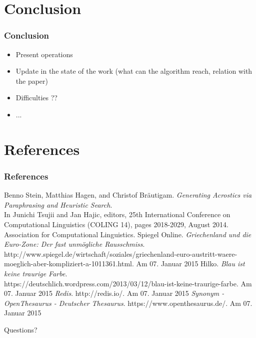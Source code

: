 \documentclass{beamer}
\begin{document}
\section{Conclusion}

\begin{frame}
\frametitle{Conclusion}
\begin{itemize}
\item Present operations
\item Update in the state of the work (what can the algorithm reach, relation with the paper)
\item Difficulties ??
\item ...
\end{itemize}
\end{frame}

\section{References}

\begin{frame}
\frametitle{References}
\scriptsize
\begin{thebibliography}{1}
	Benno Stein, Matthias Hagen, and Christof Bräutigam. \emph{Generating Acrostics via Paraphrasing and Heuristic Search}. \\
	In Junichi Tsujii and Jan Hajic, editors, 25th International Conference on Computational Linguistics (COLING 14), pages 2018-2029, August 2014. Association for Computational Linguistics.
	Spiegel Online. \emph{Griechenland und die Euro-Zone: Der fast unmögliche Rausschmiss}. \\
	http://www.spiegel.de/wirtschaft/soziales/griechenland-euro-austritt-waere-moeglich-aber-kompliziert-a-1011361.html. Am 07. Januar 2015
	Hilko. \emph{Blau ist keine traurige Farbe}. \\
	https://deutschlich.wordpress.com/2013/03/12/blau-ist-keine-traurige-farbe. Am 07. Januar 2015
	\emph{Redis}. http://redis.io/. Am 07. Januar 2015
	\emph{Synonym - OpenThesaurus - Deutscher Thesaurus}. https://www.openthesaurus.de/. Am 07. Januar 2015
\end{thebibliography}
\end{frame}

\begin{frame}
\Huge{\centerline{Questions?}}
\end{frame}

\end{document}
